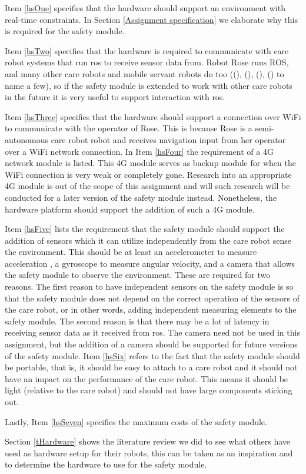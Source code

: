 \documentclass[12pt]{scrreprt}
\begin{document}
Item \ref{hsOne} specifies that the hardware should support an environment with real-time constraints. In Section \ref{Assignment specification} we elaborate why this is required for the safety module.
\par
Item \ref{hsTwo} specifies that the hardware is required to communicate with care robot systems that run \acrlong{ros} to receive sensor data from. Robot Rose runs ROS, and many other care robots and mobile servant robots do too ((\cite{human-robot}), (\cite{spencer}), (\cite{delgado}), (\cite{dimitris}) to name a few), so if the safety module is extended to work with other care robots in the future it is very useful to support interaction with \acrshort{ros}. 
\par
Item \ref{hsThree} specifies that the hardware should support a connection over WiFi to communicate with the operator of Rose. This is because Rose is a semi-autonomous care robot robot and receives navigation input from her operator over a WiFi network connection. In Item \ref{hsFour} the requirement of a 4G network module is listed. This 4G module serves as backup module for when the WiFi connection is very weak or completely gone. Research into an appropriate 4G module is out of the scope of this assignment and will such research will be conducted for a later version of the safety module instead. Nonetheless, the hardware platform should support the addition of such a 4G module.
\par
Item \ref{hsFive} lists the requirement that the safety module should support the addition of sensors which it can utilize independently from the care robot sense the environment. This should be at least an accelerometer to measure acceleration , a gyroscope to measure angular velocity, and a camera that allows the safety module to observe the environment. These are required for two reasons. The first reason to have independent sensors on the safety module is so that the safety module does not depend on the correct operation of the sensors of the care robot, or in other words, adding independent measuring elements to the safety module. The second reason is that there may be a lot of latency in receiving sensor data as it received from \acrshort{ros}. The camera need not be used in this assignment, but the addition of a camera should be supported for future versions of the safety module. 
Item \ref{hsSix} refers to the fact that the safety module should be portable, that is, it should be easy to attach to a care robot and it should not have an impact on the performance of the care robot. This means it should be light (relative to the care robot) and should not have large components sticking out.
\par
Lastly, Item \ref{hsSeven} specifies the maximum costs of the safety module.
\par
Section \ref{tHardware} shows the literature review we did to see what others have used as hardware setup for their robots, this can be taken as an inspiration and to determine the hardware to use for the safety module.
\end{document}
